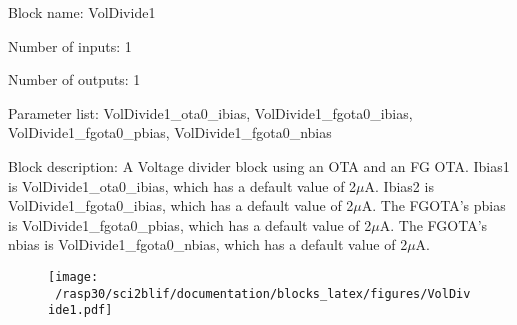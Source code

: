 \pagebreak

Block name: VolDivide1

Number of inputs: 1

Number of outputs: 1

Parameter list: VolDivide1\_ota0\_ibias, VolDivide1\_fgota0\_ibias, VolDivide1\_fgota0\_pbias, VolDivide1\_fgota0\_nbias

Block description: 
A Voltage divider block using an OTA and an FG OTA. Ibias1 is VolDivide1\_ota0\_ibias, which has a default value of 2$\mu$A. Ibias2 is VolDivide1\_fgota0\_ibias, which has a default value of 2$\mu$A. The FGOTA's pbias is VolDivide1\_fgota0\_pbias, which has a default value of 2$\mu$A. The FGOTA's nbias is VolDivide1\_fgota0\_nbias, which has a default value of 2$\mu$A. 

\begin{figure}[H]  %
\texttt{[image: ~/rasp30/sci2blif/documentation/blocks\_latex/figures/VolDivide1.pdf]}
\end{figure}


